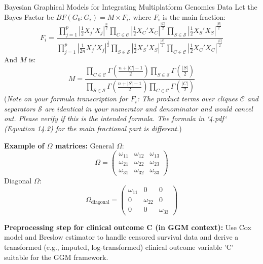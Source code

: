 \documentclass[twocolumn]{article}
\begin{document}
\begin{literaturepaper}{Bayesian Graphical Models for Integrating Multiplatform Genomics Data \cite{Wang_Baladandayuthapani_Holmes_Do_2013}}
    Let the Bayes Factor be $BF(G_0 : G_i) = M \times F_i$, where $F_i$ is the main fraction:
    \[ F_i = \frac{\prod_{j=1}^p \left|\frac{1}{2}X_j'X_j\right|^{\frac{n}{2}} \prod_{C \in \mathcal{C}} \left|\frac{1}{2}X_C'X_C\right|^{\frac{|C|}{2}}\prod_{S \in \mathcal{S}} \left|\frac{1}{2}X_S'X_S\right|^{\frac{|S|}{2}}}{\prod_{j=1}^p \left|\frac{1}{2n}X_j'X_j\right|^{\frac{1}{2}} \prod_{S \in \mathcal{S}} \left|\frac{1}{2}X_S'X_S\right|^{\frac{|S|}{2}} \prod_{C \in \mathcal{C}} \left|\frac{1}{2}X_C'X_C\right|^{\frac{|C|}{2}}} \]
    And $M$ is:
    \[ M = \frac{\prod_{C \in \mathcal{C}} \Gamma\left(\frac{n+|C|-1}{2}\right) \prod_{S \in \mathcal{S}} \Gamma\left(\frac{|S|}{2}\right)}{\prod_{S \in \mathcal{S}} \Gamma\left(\frac{n+|S|-1}{2}\right)\prod_{C \in \mathcal{C}} \Gamma\left(\frac{|C|}{2}\right)} \]
    (\textit{Note on your formula transcription for $F_i$: The product terms over cliques $\mathcal{C}$ and separators $\mathcal{S}$ are identical in your numerator and denominator and would cancel out. Please verify if this is the intended formula. The formula in `4.pdf` (Equation 14.2) for the main fractional part is different.})

    \textbf{Example of $\Omega$ matrices:}
    General $\Omega$:
    \[ \Omega = \begin{pmatrix} \omega_{11} & \omega_{12} & \omega_{13} \\ \omega_{21} & \omega_{22} & \omega_{23} \\ \omega_{31} & \omega_{32} & \omega_{33} \end{pmatrix} \]
    Diagonal $\Omega$:
    \[ \Omega_{\text{diagonal}} = \begin{pmatrix} \omega_{11} & 0 & 0 \\ 0 & \omega_{22} & 0 \\ 0 & 0 & \omega_{33} \end{pmatrix} \]

    \textbf{Preprocessing step for clinical outcome C (in GGM context):} Use Cox model and Breslow estimator to handle censored survival data and derive a transformed (e.g., imputed, log-transformed) clinical outcome variable 'C' suitable for the GGM framework.
    
\end{literaturepaper}
\end{document}
